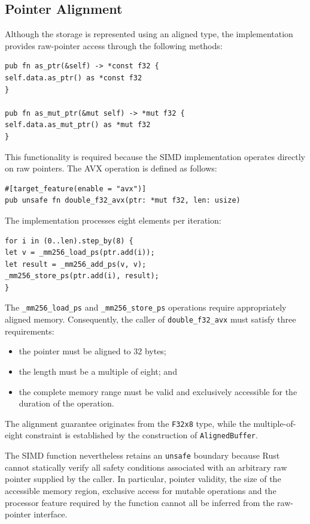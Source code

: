 \subsection{Pointer Alignment}

Although the storage is represented using an aligned type, the implementation provides raw-pointer access through the 
following methods:

\begin{lstlisting}[style=rustblock]
pub fn as_ptr(&self) -> *const f32 {
self.data.as_ptr() as *const f32
}

pub fn as_mut_ptr(&mut self) -> *mut f32 {
self.data.as_mut_ptr() as *mut f32
}
\end{lstlisting}

This functionality is required because the SIMD implementation operates directly on raw pointers. 
The AVX operation is defined as follows:

\begin{lstlisting}[style=rustblock]
#[target_feature(enable = "avx")]
pub unsafe fn double_f32_avx(ptr: *mut f32, len: usize)
\end{lstlisting}

The implementation processes eight elements per iteration:

\begin{lstlisting}[style=rustblock]
for i in (0..len).step_by(8) {
let v = _mm256_load_ps(ptr.add(i));
let result = _mm256_add_ps(v, v);
_mm256_store_ps(ptr.add(i), result);
}
\end{lstlisting}

The \lstinline|_mm256_load_ps| and \lstinline|_mm256_store_ps|
operations require appropriately aligned memory. Consequently, the caller of \lstinline|double_f32_avx| must satisfy 
three requirements:

\begin{itemize}
\item the pointer must be aligned to 32 bytes;
\item the length must be a multiple of eight; and
\item the complete memory range must be valid and exclusively accessible
for the duration of the operation.
\end{itemize}

The alignment guarantee originates from the \lstinline|F32x8| type, while the multiple-of-eight constraint is
established by the construction of \lstinline|AlignedBuffer|.

The SIMD function nevertheless retains an \lstinline|unsafe| boundary because Rust cannot statically verify all 
safety conditions associated with an arbitrary raw pointer supplied by the caller. In particular,
pointer validity, the size of the accessible memory region, exclusive access for mutable operations 
and the processor feature required by the function cannot all be inferred from the raw-pointer interface.

